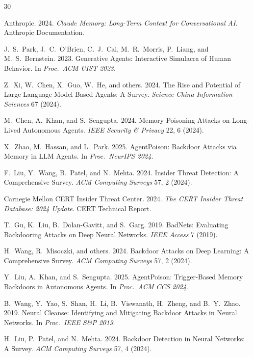 \documentclass[sigconf,nonacm]{acmart}
\begin{document}
\sloppy

\begin{thebibliography}{30}

Anthropic. 2024. \textit{Claude Memory: Long-Term Context for
Conversational AI}. Anthropic Documentation.

J.~S.~Park, J.~C.~O'Brien, C.~J.~Cai, M.~R.~Morris, P.~Liang, and
M.~S.~Bernstein. 2023. Generative Agents: Interactive Simulacra of
Human Behavior. In \textit{Proc.\ ACM UIST 2023}.

Z.~Xi, W.~Chen, X.~Guo, W.~He, and others. 2024. The Rise and
Potential of Large Language Model Based Agents: A Survey.
\textit{Science China Information Sciences} 67 (2024).

M.~Chen, A.~Khan, and S.~Sengupta. 2024. Memory Poisoning Attacks
on Long-Lived Autonomous Agents. \textit{IEEE Security \& Privacy}
22, 6 (2024).

X.~Zhao, M.~Hassan, and L.~Park. 2025. AgentPoison: Backdoor
Attacks via Memory in LLM Agents. In \textit{Proc.\ NeurIPS 2024}.

F.~Liu, Y.~Wang, B.~Patel, and N.~Mehta. 2024. Insider Threat
Detection: A Comprehensive Survey. \textit{ACM Computing Surveys}
57, 2 (2024).

Carnegie Mellon CERT Insider Threat Center. 2024.
\textit{The CERT Insider Threat Database: 2024 Update}. CERT
Technical Report.

T.~Gu, K.~Liu, B.~Dolan-Gavitt, and S.~Garg. 2019. BadNets:
Evaluating Backdooring Attacks on Deep Neural Networks.
\textit{IEEE Access} 7 (2019).

H.~Wang, R.~Misoczki, and others. 2024. Backdoor Attacks on Deep
Learning: A Comprehensive Survey. \textit{ACM Computing Surveys}
57, 2 (2024).

Y.~Liu, A.~Khan, and S.~Sengupta. 2025. AgentPoison: Trigger-Based
Memory Backdoors in Autonomous Agents. In \textit{Proc.\ ACM CCS
2024}.

B.~Wang, Y.~Yao, S.~Shan, H.~Li, B.~Viswanath, H.~Zheng, and
B.~Y.~Zhao. 2019. Neural Cleanse: Identifying and Mitigating
Backdoor Attacks in Neural Networks. In \textit{Proc.\ IEEE S\&P
2019}.

H.~Liu, P.~Patel, and N.~Mehta. 2024. Backdoor Detection in
Neural Networks: A Survey. \textit{ACM Computing Surveys} 57, 4
(2024).


\end{thebibliography}
\end{document}

